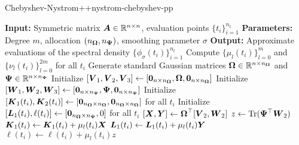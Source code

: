 \documentclass[12pt]{article}
\begin{document}
\begin{algo}{Chebyshev-Nystrom++}{nystrom-chebyshev-pp}
\begin{algorithmic}[1]
    \Statex \textbf{Input:} Symmetric matrix $\boldsymbol{A} \in \mathbb{R}^{n \times n}$, evaluation points $\{t_i\}_{i=1}^{n_t}$
    \Statex \textbf{Parameters:} Degree $m$, allocation $(n_{\boldsymbol{\Omega}}, n_{\boldsymbol{\Psi}})$,  smoothing parameter $\sigma$
    \Statex \textbf{Output:} Approximate evaluations of the spectral density $\{\phi_{\sigma}(t_i)\}_{i=1}^{n_t}$
    \State Compute $\{\mu_l(t_i)\}_{l=0}^{m}$ and $\{\nu_l(t_i)\}_{l=0}^{2m}$ for all $t_i$ %
    \State Generate standard Gaussian matrices $\boldsymbol{\Omega} \in \mathbb{R}^{n \times n_{\boldsymbol{\Omega}}}$ and $\boldsymbol{\Psi} \in \mathbb{R}^{n \times n_{\boldsymbol{\Psi}}}$%
    \State Initialize $[\boldsymbol{V}_1, \boldsymbol{V}_2, \boldsymbol{V}_3] \gets [\boldsymbol{0}_{n \times n_{\boldsymbol{\Omega}}}, \boldsymbol{\boldsymbol{\Omega}}, \boldsymbol{0}_{n \times n_{\boldsymbol{\Omega}}}]$
    \State Initialize $[\boldsymbol{W}_1, \boldsymbol{W}_2, \boldsymbol{W}_3] \gets [\boldsymbol{0}_{n \times n_{\boldsymbol{\Psi}}}, \boldsymbol{\Psi}, \boldsymbol{0}_{n \times n_{\boldsymbol{\Psi}}}]$
    \State Initialize $[\boldsymbol{K}_1(t_i), \boldsymbol{K}_2(t_i)] \gets [\boldsymbol{0}_{n_{\boldsymbol{\Omega}} \times n_{\boldsymbol{\Omega}}}, \boldsymbol{0}_{n_{\boldsymbol{\Omega}} \times n_{\boldsymbol{\Omega}}}]$ for all $t_i$
    \State Initialize $[\boldsymbol{L}_1(t_i), \ell(t_i)] \gets [\boldsymbol{0}_{n_{\boldsymbol{\Omega}} \times n_{\boldsymbol{\Psi}}}, 0]$ for all $t_i$
    \State $[\boldsymbol{X}, \boldsymbol{Y}] \gets \boldsymbol{\boldsymbol{\Omega}}^{\top} [\boldsymbol{V}_2, \boldsymbol{W}_2]$  
      \State $z \gets \operatorname{Tr}(\boldsymbol{\Psi}^{\top} \boldsymbol{W}_2)$
            \State $\boldsymbol{K}_1(t_i) \gets \boldsymbol{K}_1(t_i) + \mu_l(t_i) \boldsymbol{X}$ 
            \State $\boldsymbol{L}_1(t_i) \gets \boldsymbol{L}_1(t_i) + \mu_l(t_i) \boldsymbol{Y}$ 
            \State $\ell(t_i) \gets \ell(t_i) + \mu_l(t_i) z$ 

\end{algorithmic}
\end{algo}
\end{document}
